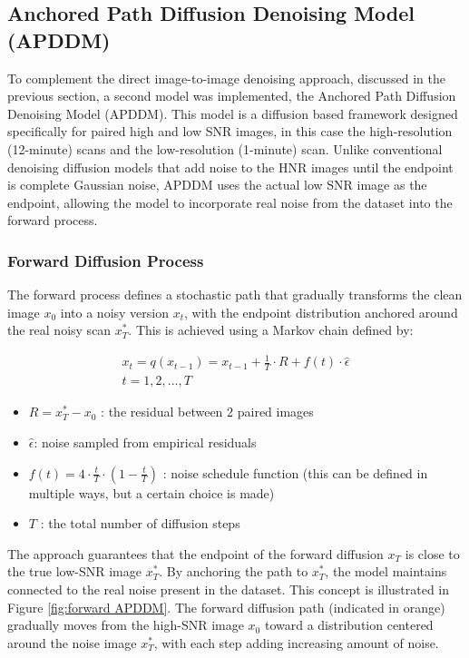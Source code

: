 \documentclass[twocolumn]{article}
\begin{document}
\subsection{Anchored Path Diffusion Denoising Model (APDDM)}
To complement the direct image-to-image denoising approach, discussed in the previous section, a second model was implemented, 
the Anchored Path Diffusion Denoising Model (APDDM). 
This model is a diffusion based framework designed specifically for paired high and low SNR images, in this case the high-resolution (12-minute) scans and the low-resolution (1-minute) scan. Unlike conventional denoising diffusion models that add noise to the HNR images until the endpoint is complete Gaussian noise, APDDM uses the actual low SNR image as the endpoint, allowing the model to incorporate real noise from the dataset into the forward process. 

\subsubsection{Forward Diffusion Process}
The forward process defines a stochastic path that gradually transforms the clean image $x_0$ into a noisy version $x_t$, with the endpoint distribution anchored around the real noisy scan $x_T^*$. 
This is achieved using a Markov chain defined by:

\begin{equation}\label{eq:Markov chain}
\begin{split}
x_t=q(x_{t-1})=x_{t-1}+\frac{1}{T}\cdot R+f(t)\cdot \hat{\epsilon}\\
t=1,2,...,T
\end{split}
\end{equation}

\begin{itemize}
    \item $R=x_T^*-x_0$ : the residual between 2 paired images
    \item $\hat{\epsilon} $: noise sampled from empirical residuals
    \item $f(t)=4 \cdot \frac{t}{T} \cdot (1-\frac{t}{T})$ : noise schedule function (this can be defined in multiple ways, but a certain choice is made)
    \item $T$ : the total number of diffusion steps
\end{itemize}


The approach guarantees that the endpoint of the forward diffusion $x_T$ is close to the true low-SNR image $x_T^*$. 
By anchoring the path to $x_T^*$, the model maintains connected to the real noise present in the dataset. 
This concept is illustrated in Figure \ref{fig:forward APDDM}. The forward diffusion path (indicated in orange) gradually moves from the high-SNR image $x_0$ toward a distribution centered around the noise image $x_T^*$, with each step adding increasing amount of noise. 
\end{document}
